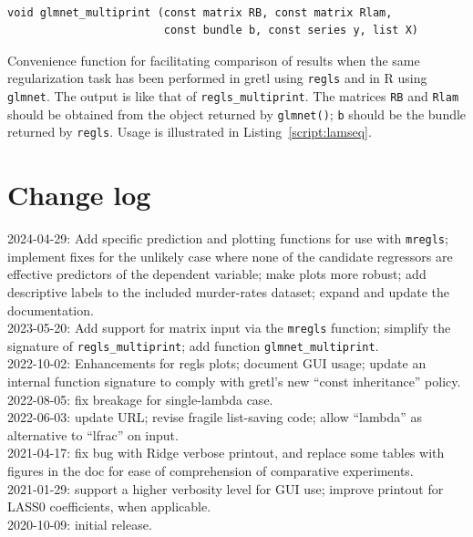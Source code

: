 \documentclass{article}
\newenvironment{funcdoc}
{\noindent\hrulefill\\[-12pt]}
{\medbreak}
\begin{document}
\begin{funcdoc}
\begin{verbatim}
void glmnet_multiprint (const matrix RB, const matrix Rlam,
                        const bundle b, const series y, list X)
\end{verbatim}
  Convenience function for facilitating comparison of results when the
  same regularization task has been performed in gretl using
  \texttt{regls} and in \textsf{R} using \texttt{glmnet}. The output
  is like that of \texttt{regls\_multiprint}.  The matrices
  \texttt{RB} and \texttt{Rlam} should be obtained from the object
  returned by \texttt{glmnet()}; \texttt{b} should be the bundle
  returned by \texttt{regls}.  Usage is illustrated in
  Listing~\ref{script:lamseq}.
\end{funcdoc}

\section{Change log}
\label{sec:changes}

2024-04-29: Add specific prediction and plotting functions for use
with \texttt{mregls}; implement fixes for the unlikely case where none
of the candidate regressors are effective predictors of the dependent
variable; make plots more robust; add descriptive labels to the
included murder-rates dataset; expand and update the documentation.\\[4pt]
2023-05-20: Add support for matrix input via the \texttt{mregls}
function; simplify the signature of \texttt{regls\_multiprint};
add function \texttt{glmnet\_multiprint}.\\[4pt]
2022-10-02: Enhancements for regls plots; document GUI usage; update
an internal function signature to comply with gretl's
new ``const inheritance'' policy.\\[4pt]
2022-08-05: fix breakage for single-lambda case.\\[4pt]
2022-06-03: update URL; revise fragile list-saving code;
allow ``lambda'' as alternative to ``lfrac'' on input.\\[4pt]
2021-04-17: fix bug with Ridge verbose printout, and replace some
tables with figures in the doc for ease of comprehension
of comparative experiments.\\[4pt]
2021-01-29: support a higher verbosity level for GUI use;
improve printout for LASS0 coefficients, when applicable.\\[4pt]
2020-10-09: initial release.
\end{document}
